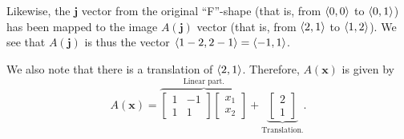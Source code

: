 \documentclass[letterpaper]{article}
\begin{document}
\begin{mdframed}[]
    \bigskip 

    Likewise, the $\mathbf{j}$ vector from the original ``F''-shape (that is, from $\langle 0, 0 \rangle$ to $\langle 0, 1 \rangle$) has been mapped to the image $A(\mathbf{j})$ vector (that is, from $\langle 2, 1 \rangle$ to $\langle 1, 2 \rangle$). We see that $A(\mathbf{j})$ is thus the vector $\langle 1 - 2, 2 - 1 \rangle = \langle -1, 1 \rangle$. 

    \bigskip 

    We also note that there is a translation of $\langle 2, 1 \rangle$. Therefore, $A(\mathbf{x})$ is given by
    \[A(\mathbf{x}) = \overbrace{\begin{bmatrix}
        1 & -1 \\ 1 & 1
    \end{bmatrix} \begin{bmatrix}
        x_1 \\ x_2
    \end{bmatrix}}^{\text{Linear part.}} + \underbrace{\begin{bmatrix}
        2 \\ 1
    \end{bmatrix}}_{\text{Translation.}}.\]
\end{mdframed}
\end{document}
